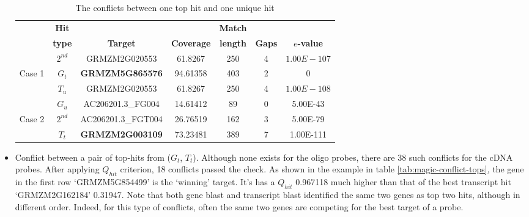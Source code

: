 \begin{itemize}
\begin{table}[b]
	\centering
	\begin{footnotesize}
	\caption{The conflicts between one top hit and one unique hit} 
	\label{tab:magic-conflict-topuniq}
	\begin{tabular}{@{}c|cccccc@{}}
	\toprule
	& \textbf{Hit} & & & \textbf{Match} & & \\
	& \textbf{type} & \textbf{Target} & \textbf{Coverage} & \textbf{length} 
	& \textbf{Gaps} & \textbf{$e$-value} \\ 
	\midrule
	& $2^{nd}$  & GRMZM2G020553 & 61.8267 & 250 & 4 & $1.00E-107$ \\ 
	Case 1 & \textbf{$G_t$} & \textbf{GRMZM5G865576} & 94.61358 & 403 & 2 & 0 
	\\ 
	& $T_u$ & GRMZM2G020553 & 61.8267 & 250 & 4 & $1.00E-108$ \\

 	\hline
 	
	& $G_u$ & AC206201.3\_FG004 & 14.61412 & 89 & 0 & 5.00E-43 \\
	Case 2 & $2^{nd}$ & AC206201.3\_FGT004 & 26.76519 & 162 & 3 & 5.00E-79 
	\\
	& $T_t$ & \textbf{GRMZM2G003109} & 73.23481 & 389 & 7 & 1.00E-111 \\
	\bottomrule
	\end{tabular}
	\end{footnotesize}
\end{table}

\item Conflict between a pair of top-hits from ($G_t$, $T_t$). 
Although none exists for the oligo probes, there are 38 such conflicts for 
the cDNA probes. 
After applying $Q_{hit}$ criterion, 18 conflicts passed the check. 
As shown in the example in table \ref{tab:magic-conflict-tops}, the gene in the 
first row ‘GRMZM5G854499’ is the `winning' target. 
It’s has a $Q_{hit}$ 0.967118 much higher than that of the best transcript 
hit ‘GRMZM2G162184’ 0.31947. 
Note that both gene blast and transcript blast identified the same two genes as 
top two hits, although in different order.
Indeed, for this type of conflicts, often the same two genes are competing for 
the best target of a probe. 

\end{itemize}

